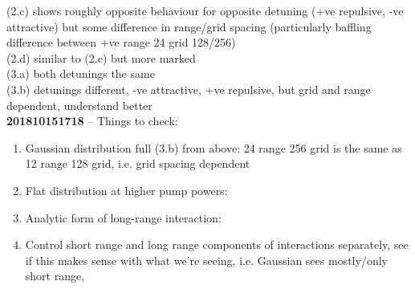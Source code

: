 \documentclass[a4paper,nobalancelastpage]{revtex4-1}
\newcommand{\mmtitle}[1]{\textcolor{multimode}{\textbf{#1}}}
\begin{document}
(2.c) shows roughly opposite behaviour for opposite detuning (+ve repulsive, -ve attractive) but some difference in range/grid spacing (particularly baffling difference between +ve range 24 grid 128/256)\\

(2.d) similar to (2.c) but more marked\\

(3.a) both detunings the same\\

(3.b) detunings different, -ve attractive, +ve repulsive, but grid and range dependent, understand better\\

\mmtitle{201810151718} -- Things to check:

\begin{enumerate}
\item Gaussian distribution full (3.b) from above: 24 range 256 grid is the same as 12 range 128 grid, i.e. grid spacing dependent
\item Flat distribution at higher pump powers:
\item Analytic form of long-range interaction:
\item Control short range and long range components of interactions separately, see if this makes sense with what we're seeing, i.e. Gaussian sees mostly/only short range,
\end{enumerate}

\end{document}
